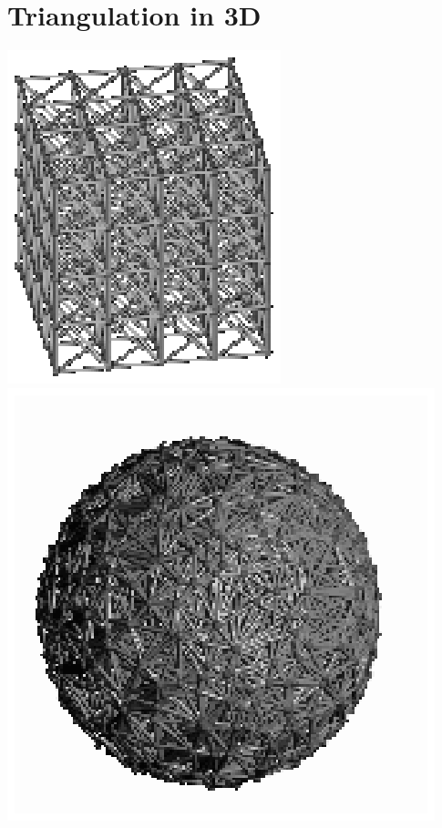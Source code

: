 \chapter{Triangulation in 3D}
\label{chapter-Triangulation3}
\begin{ccTexOnly}
\vspace*{-2cm}
\includegraphics{grille.eps} \hspace*{2cm} 
\includegraphics{sphere.eps} 
\end{ccTexOnly}
